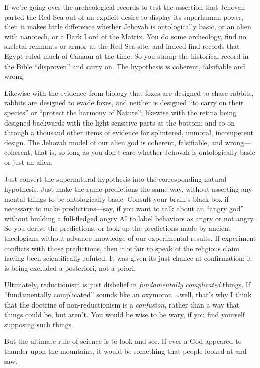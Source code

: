{
 If we're going over the archeological records to
test the assertion that Jehovah parted the Red Sea out of an explicit
desire to display its superhuman power, then it makes little difference
whether Jehovah is ontologically basic, or an alien with nanotech, or a
Dark Lord of the Matrix. You do some archeology, find no skeletal
remnants or armor at the Red Sea site, and indeed find records that
Egypt ruled much of Canaan at the time. So you stamp the historical
record in the Bible ``disproven''
and carry on. The hypothesis is coherent, falsifiable and wrong.}

{
 Likewise with the evidence from biology that foxes are designed to
chase rabbits, rabbits are designed to evade foxes, and neither is
designed ``to carry on their
species'' or ``protect the harmony
of Nature''; likewise with the retina being designed
backwards with the light-sensitive parts at the bottom; and so on
through a thousand other items of evidence for splintered, immoral,
incompetent design. The Jehovah model of our alien god is coherent,
falsifiable, and wrong---coherent, that is, so long as you
don't care whether Jehovah is ontologically basic or
just an alien.}

{
 Just convert the supernatural hypothesis into the corresponding
natural hypothesis. Just make the same predictions the same way,
without asserting any mental things to be ontologically basic. Consult
your brain's black box if necessary to make
predictions---say, if you want to talk about an
``angry god'' without building a
full-fledged angry AI to label behaviors as angry or not angry. So you
derive the predictions, or look up the predictions made by ancient
theologians without advance knowledge of our experimental results. If
experiment conflicts with those predictions, then it is fair to speak
of the religious claim having been scientifically refuted. It was given
its just chance at confirmation; it is being excluded a posteriori, not
a priori.}

{
 Ultimately, reductionism is just disbelief in
\textit{fundamentally complicated} things. If
``fundamentally complicated'' sounds
like an oxymoron \ldots well, that's why I think that
the doctrine of non-reductionism is a \textit{confusion}, rather than a
way that things could be, but aren't. You would be wise
to be wary, if you find yourself supposing such things.}

{
 But the ultimate rule of science is to look and see. If ever a God
appeared to thunder upon the mountains, it would be something that
people looked at and saw.}

